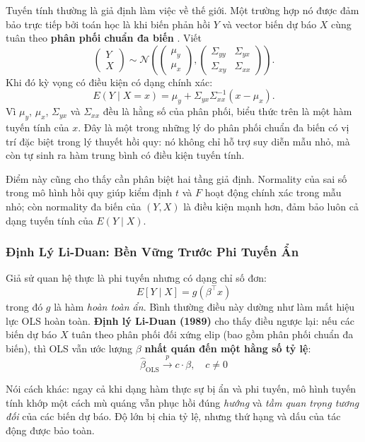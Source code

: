 Tuyến tính thường là giả định làm việc về thế giới. Một trường hợp nó được đảm bảo trực tiếp bởi toán học là khi biến phản hồi $Y$ và vector biến dự báo $X$ cùng tuân theo \textbf{phân phối chuẩn đa biến} \cite[Sec.~4.5.1, p.~91]{weisberg2014applied}. Viết
\[
  \begin{pmatrix} Y \\ X \end{pmatrix}
  \sim \mathcal{N}\left(
  \begin{pmatrix} \mu_y \\ \mu_x \end{pmatrix},
  \begin{pmatrix}
    \Sigma_{yy} & \Sigma_{yx} \\
    \Sigma_{xy} & \Sigma_{xx}
  \end{pmatrix}
  \right).
\]
Khi đó kỳ vọng có điều kiện có dạng chính xác:
\[
  E(Y \mid X = x)
  = \mu_y + \Sigma_{yx}\Sigma_{xx}^{-1}(x - \mu_x).
\]
Vì $\mu_y$, $\mu_x$, $\Sigma_{yx}$ và $\Sigma_{xx}$ đều là hằng số của phân phối, biểu thức trên là một hàm tuyến tính của $x$. Đây là một trong những lý do phân phối chuẩn đa biến có vị trí đặc biệt trong lý thuyết hồi quy: nó không chỉ hỗ trợ suy diễn mẫu nhỏ, mà còn tự sinh ra hàm trung bình có điều kiện tuyến tính.

Điểm này cũng cho thấy cần phân biệt hai tầng giả định. Normality của sai số trong mô hình hồi quy giúp kiểm định $t$ và $F$ hoạt động chính xác trong mẫu nhỏ; còn normality đa biến của $(Y, X)$ là điều kiện mạnh hơn, đảm bảo luôn cả dạng tuyến tính của $E(Y \mid X)$.

\subsubsection{Định Lý Li-Duan: Bền Vững Trước Phi Tuyến Ẩn}

Giả sử quan hệ thực là phi tuyến nhưng có dạng chỉ số đơn:
\[
  E[Y \mid X] = g(\beta^\top x)
\]
trong đó $g$ là hàm \textit{hoàn toàn ẩn}. Bình thường điều này dường như làm mất hiệu lực OLS hoàn toàn. \textbf{Định lý Li-Duan (1989)} \cite[Sec.~8.2.1, pp.~194--195]{weisberg2014applied} cho thấy điều ngược lại: nếu các biến dự báo $X$ tuân theo phân phối đối xứng elip (bao gồm phân phối chuẩn đa biến), thì OLS vẫn ước lượng $\beta$ \textbf{nhất quán đến một hằng số tỷ lệ}:
\[
  \hat{\beta}_{\text{OLS}} \xrightarrow{p} c \cdot \beta, \quad c \neq 0
\]

Nói cách khác: ngay cả khi dạng hàm thực sự bị ẩn và phi tuyến, mô hình tuyến tính khớp một cách mù quáng vẫn phục hồi đúng \textit{hướng} và \textit{tầm quan trọng tương đối} của các biến dự báo. Độ lớn bị chia tỷ lệ, nhưng thứ hạng và dấu của tác động được bảo toàn.


